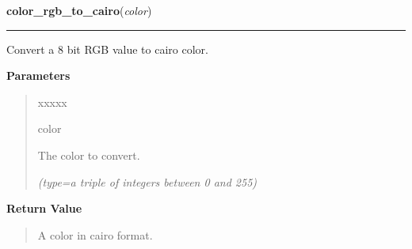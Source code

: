     \vspace{0.5ex}

\hspace{.8\funcindent}\begin{boxedminipage}{\funcwidth}

    \raggedright \textbf{color\_rgb\_to\_cairo}(\textit{color})

    \vspace{-1.5ex}

    \rule{\textwidth}{0.5\fboxrule}
\setlength{\parskip}{2ex}
    Convert a 8 bit RGB value to cairo color.

\setlength{\parskip}{1ex}
      \textbf{Parameters}
      \vspace{-1ex}

      \begin{quote}
        \begin{Ventry}{xxxxx}

          \item[color]

          The color to convert.

            {\it (type=a triple of integers between 0 and 255)}

        \end{Ventry}

      \end{quote}

      \textbf{Return Value}
    \vspace{-1ex}

      \begin{quote}
      A color in cairo format.

      \end{quote}

    \end{boxedminipage}

    \label{pygtk_chart:basics:color_html_to_cairo}

    \vspace{0.5ex}

